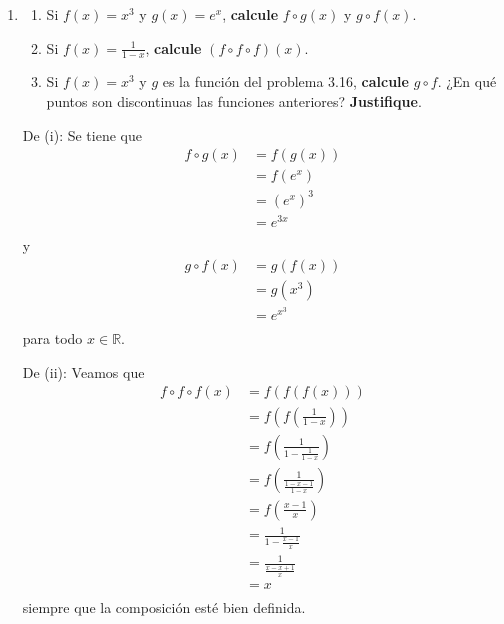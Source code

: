 \documentclass[12pt]{article}
\begin{document}
\begin{enumerate}
    \item \begin{enumerate}
        \item Si $f(x)=x^3$ y $g(x)=e^x$, \textbf{calcule} $f\circ g(x)$ y $g\circ f(x)$.
        \item Si $f(x)=\frac{1}{1-x}$, \textbf{calcule} $(f\circ f\circ f)(x)$.
        \item Si $f(x)=x^3$ y $g$ es la función del problema 3.16, \textbf{calcule} $g\circ f$.
        ¿En qué puntos son discontinuas las funciones anteriores? \textbf{Justifique}.
    \end{enumerate}

    \begin{sol}
        De (i): Se tiene que
        \begin{equation*}
            \begin{split}
                f\circ g(x)&=f(g(x))\\
                &=f(e^x)\\
                &=(e^x)^3\\
                &=e^{ 3x}\\
            \end{split}
        \end{equation*}
        y
        \begin{equation*}
            \begin{split}
                g\circ f(x)&=g(f(x))\\
                &=g(x^3)\\
                &=e^{ x^3}\\
            \end{split}
        \end{equation*}
        para todo $x\in\mathbb{R}$.

        De (ii): Veamos que
        \begin{equation*}
            \begin{split}
                f\circ f\circ f(x)&=f(f(f(x)))\\
                &=f\left(f\left( \frac{1}{1-x}\right)\right)\\
                &=f\left(\frac{1}{1-\frac{1}{1-x}}\right)\\
                &=f\left(\frac{1}{\frac{1-x-1}{1-x}}\right)\\
                &=f\left(\frac{x-1}{x}\right)\\
                &=\frac{1}{1-\frac{x-1}{x}}\\
                &=\frac{1}{\frac{x-x+1}{x}}\\
                &=x\\
            \end{split}
        \end{equation*}
        siempre que la composición esté bien definida.


\end{sol}
\end{enumerate}
\end{document}
